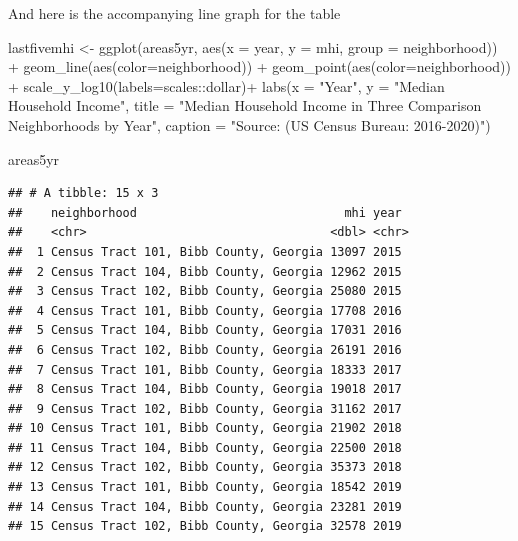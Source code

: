 \documentclass[
]{article}
\newenvironment{Shaded}{\begin{snugshade}}{\end{snugshade}}
\newcommand{\AttributeTok}[1]{\textcolor[rgb]{0.77,0.63,0.00}{#1}}
\newcommand{\FunctionTok}[1]{\textcolor[rgb]{0.00,0.00,0.00}{#1}}
\newcommand{\NormalTok}[1]{#1}
\newcommand{\OtherTok}[1]{\textcolor[rgb]{0.56,0.35,0.01}{#1}}
\newcommand{\SpecialCharTok}[1]{\textcolor[rgb]{0.00,0.00,0.00}{#1}}
\newcommand{\StringTok}[1]{\textcolor[rgb]{0.31,0.60,0.02}{#1}}
\begin{document}
And here is the accompanying line graph for the table

\begin{Shaded}
\begin{Highlighting}[]
\NormalTok{lastfivemhi }\OtherTok{\textless{}{-}} \FunctionTok{ggplot}\NormalTok{(areas5yr, }\FunctionTok{aes}\NormalTok{(}\AttributeTok{x =}\NormalTok{ year, }\AttributeTok{y =}\NormalTok{ mhi, }\AttributeTok{group =}\NormalTok{ neighborhood)) }\SpecialCharTok{+} 
\FunctionTok{geom\_line}\NormalTok{(}\FunctionTok{aes}\NormalTok{(}\AttributeTok{color=}\NormalTok{neighborhood)) }\SpecialCharTok{+}
\FunctionTok{geom\_point}\NormalTok{(}\FunctionTok{aes}\NormalTok{(}\AttributeTok{color=}\NormalTok{neighborhood)) }\SpecialCharTok{+}
\FunctionTok{scale\_y\_log10}\NormalTok{(}\AttributeTok{labels=}\NormalTok{scales}\SpecialCharTok{::}\NormalTok{dollar)}\SpecialCharTok{+}
\FunctionTok{labs}\NormalTok{(}\AttributeTok{x =} \StringTok{"Year"}\NormalTok{, }\AttributeTok{y =} \StringTok{"Median Household Income"}\NormalTok{,}
     \AttributeTok{title =} \StringTok{"Median Household Income in Three Comparison Neighborhoods by Year"}\NormalTok{,}
     \AttributeTok{caption =} \StringTok{"Source: (US Census Bureau: 2016{-}2020)"}\NormalTok{)}
\end{Highlighting}
\end{Shaded}

\begin{Shaded}
\begin{Highlighting}[]
\NormalTok{areas5yr}
\end{Highlighting}
\end{Shaded}

\begin{verbatim}
## # A tibble: 15 x 3
##    neighborhood                             mhi year 
##    <chr>                                  <dbl> <chr>
##  1 Census Tract 101, Bibb County, Georgia 13097 2015 
##  2 Census Tract 104, Bibb County, Georgia 12962 2015 
##  3 Census Tract 102, Bibb County, Georgia 25080 2015 
##  4 Census Tract 101, Bibb County, Georgia 17708 2016 
##  5 Census Tract 104, Bibb County, Georgia 17031 2016 
##  6 Census Tract 102, Bibb County, Georgia 26191 2016 
##  7 Census Tract 101, Bibb County, Georgia 18333 2017 
##  8 Census Tract 104, Bibb County, Georgia 19018 2017 
##  9 Census Tract 102, Bibb County, Georgia 31162 2017 
## 10 Census Tract 101, Bibb County, Georgia 21902 2018 
## 11 Census Tract 104, Bibb County, Georgia 22500 2018 
## 12 Census Tract 102, Bibb County, Georgia 35373 2018 
## 13 Census Tract 101, Bibb County, Georgia 18542 2019 
## 14 Census Tract 104, Bibb County, Georgia 23281 2019 
## 15 Census Tract 102, Bibb County, Georgia 32578 2019
\end{verbatim}
\end{document}
